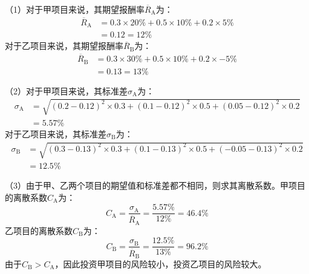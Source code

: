 \documentclass[
  10pt,
  twoside,
  openany,
  b5paper, %
  colorscheme = black, %
  xits = false,
]{qyxf-book}
\begin{document}
\begin{note}
	（1）对于甲项目来说，其期望报酬率$\overline{R}_\mathrm{A}$为：
	\begin{equation*}
		\begin{aligned}
			\overline{R}_\mathrm{A} &= 0.3 \times 20\% + 0.5 \times 10\% + 0.2 \times 5\% \\
			&=  0.12 = 12\%
		\end{aligned}
	\end{equation*}
对于乙项目来说，其期望报酬率$\overline{R}_\mathrm{B}$为：
\begin{equation*}
	\begin{aligned}
		\overline{R}_\mathrm{B} &= 0.3 \times 30\% + 0.5 \times 10\% + 0.2 \times -5\% \\
		&=  0.13 = 13\%
	\end{aligned}
\end{equation*}

（2）对于甲项目来说，其标准差$\sigma_\mathrm{A}$为：
\begin{equation*}
	\begin{aligned}
		\sigma_\mathrm{A} &= \sqrt{(0.2-0.12)^2 \times 0.3 + (0.1-0.12)^2 \times 0.5 + (0.05-0.12)^2 \times 0.2 } \\
		& = 5.57\%
	\end{aligned}
\end{equation*}
对于乙项目来说，其标准差$\sigma_\mathrm{B}$为：
\begin{equation*}
	\begin{aligned}
		\sigma_\mathrm{B} &= \sqrt{(0.3-0.13)^2 \times 0.3 + (0.1-0.13)^2 \times 0.5 + (-0.05-0.13)^2 \times 0.2 } \\
		& = 12.5\%
	\end{aligned}
\end{equation*}

（3）由于甲、乙两个项目的期望值和标准差都不相同，则求其离散系数。甲项目的离散系数$C_\mathrm{A}$为：
\begin{equation*}
	C_\mathrm{A} = \frac{\sigma_\mathrm{A}}{\overline{R}_\mathrm{A}} = \frac{5.57\%}{12\%} = 46.4\%
\end{equation*}
乙项目的离散系数$C_\mathrm{B}$为：
\begin{equation*}
	C_\mathrm{B} = \frac{\sigma_\mathrm{B}}{\overline{R}_\mathrm{B}} = \frac{12.5\%}{13\%} = 96.2\%
\end{equation*}
由于$C_\mathrm{B}>C_\mathrm{A}$，因此投资甲项目的风险较小，投资乙项目的风险较大。
\end{note}
\end{document}
